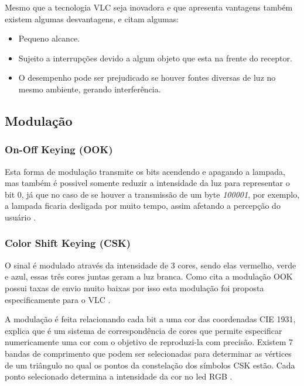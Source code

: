 Mesmo que a tecnologia VLC seja inovadora e que apresenta vantagens também existem algumas desvantagens,  e  citam algumas:

\begin{itemize}
  \item Pequeno alcance.
  \item Sujeito a interrupções devido a algum objeto que esta na frente do receptor.
  \item O desempenho pode ser prejudicado se houver fontes diversas de luz no mesmo ambiente, gerando interferência.
\end{itemize}

\subsection{Modulação}

\subsubsection{On-Off Keying (OOK)}

Esta forma de modulação transmite os bits acendendo e apagando a lampada, mas também é possivel somente reduzir a intensidade da luz para representar o bit 0, já que no caso de se houver a transmissão de um byte \emph{100001}, por exemplo, a lampada ficaria desligada por muito tempo, assim afetando a percepção do usuário \cite{matheus2017comunicaccao}.

\subsubsection{Color Shift Keying (CSK)}

O sinal é modulado através da intensidade de 3 cores, sendo elas vermelho, verde e azul, essas três cores juntas geram a luz branca. Como cita  a modulação OOK possui taxas de envio muito baixas por isso esta modulação foi proposta especificamente para o VLC \cite{matheus2017comunicaccao}. 

A modulação é feita relacionando cada bit a uma cor das coordenadas CIE 1931,  explica que é um sistema de correspondência de cores que permite especificar numericamente uma cor com o objetivo de reproduzi-la com precisão. Existem 7 bandas de comprimento que podem ser selecionadas para determinar as vértices de um triângulo no qual os pontos da constelação dos símbolos CSK estão. Cada ponto selecionado determina a intensidade da cor no led RGB \cite{matheus2017comunicaccao}.


